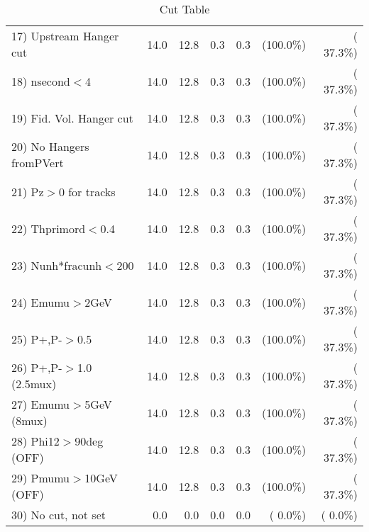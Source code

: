\begin{table}[h!]
\begin{tabular}{||l||r|r|r|r|r|r||}
 17) Upstream Hanger cut  &         14.0 &         12.8 &          0.3 &          0.3 & (100.0\%) & ( 37.3\%) \\
 18) nsecond$<$4          &         14.0 &         12.8 &          0.3 &          0.3 & (100.0\%) & ( 37.3\%) \\
 19) Fid. Vol. Hanger cut &         14.0 &         12.8 &          0.3 &          0.3 & (100.0\%) & ( 37.3\%) \\
 20) No Hangers fromPVert &         14.0 &         12.8 &          0.3 &          0.3 & (100.0\%) & ( 37.3\%) \\
 21) Pz$>$0 for tracks    &         14.0 &         12.8 &          0.3 &          0.3 & (100.0\%) & ( 37.3\%) \\
 22) Thprimord$<$0.4      &         14.0 &         12.8 &          0.3 &          0.3 & (100.0\%) & ( 37.3\%) \\
 23) Nunh*fracunh$<$200   &         14.0 &         12.8 &          0.3 &          0.3 & (100.0\%) & ( 37.3\%) \\
 24) Emumu$>$2GeV         &         14.0 &         12.8 &          0.3 &          0.3 & (100.0\%) & ( 37.3\%) \\
 25) P+,P-$>$0.5          &         14.0 &         12.8 &          0.3 &          0.3 & (100.0\%) & ( 37.3\%) \\
 26) P+,P-$>$1.0 (2.5mux) &         14.0 &         12.8 &          0.3 &          0.3 & (100.0\%) & ( 37.3\%) \\
 27) Emumu$>$5GeV  (8mux) &         14.0 &         12.8 &          0.3 &          0.3 & (100.0\%) & ( 37.3\%) \\
 28) Phi12$>$90deg  (OFF) &         14.0 &         12.8 &          0.3 &          0.3 & (100.0\%) & ( 37.3\%) \\
 29) Pmumu$>$10GeV  (OFF) &         14.0 &         12.8 &          0.3 &          0.3 & (100.0\%) & ( 37.3\%) \\
 30) No cut, not set      &          0.0 &          0.0 &          0.0 &          0.0 & (  0.0\%) & (  0.0\%) \\
 \hline
 \hline
 \end{tabular}
 \caption{Cut Table           }
 \label{tab-cutheavy_neutrino_4.000}
 \end{table}

